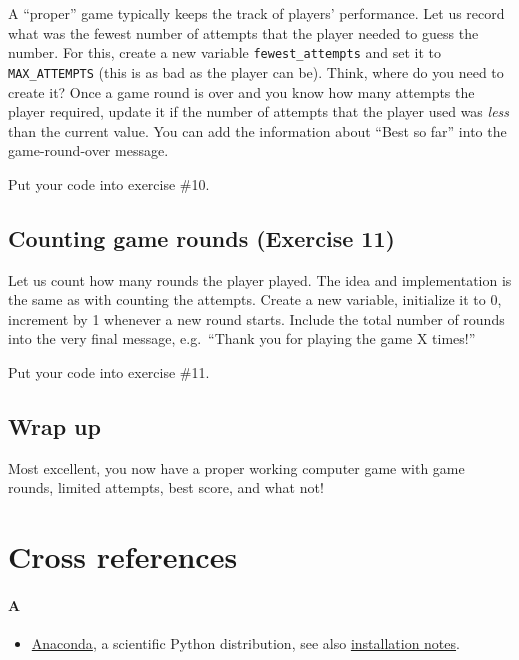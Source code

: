 \documentclass[
]{book}
\providecommand{\tightlist}{%
  \setlength{\itemsep}{0pt}\setlength{\parskip}{0pt}}
\begin{document}
A ``proper'' game typically keeps the track of players' performance. Let us record what was the fewest number of attempts that the player needed to guess the number. For this, create a new variable \texttt{fewest\_attempts} and set it to \texttt{MAX\_ATTEMPTS} (this is as bad as the player can be). Think, where do you need to create it? Once a game round is over and you know how many attempts the player required, update it if the number of attempts that the player used was \emph{less} than the current value. You can add the information about ``Best so far'' into the game-round-over message.

Put your code into exercise \#10.

\hypertarget{counting-game-rounds-exercise-11}{%
\section{Counting game rounds (Exercise 11)}\label{counting-game-rounds-exercise-11}}

Let us count how many rounds the player played. The idea and implementation is the same as with counting the attempts. Create a new variable, initialize it to 0, increment by 1 whenever a new round starts. Include the total number of rounds into the very final message, e.g.~``Thank you for playing the game X times!''

Put your code into exercise \#11.

\hypertarget{wrap-up}{%
\section{Wrap up}\label{wrap-up}}

Most excellent, you now have a proper working computer game with game rounds, limited attempts, best score, and what not!

\hypertarget{cross-references}{%
\chapter*{Cross references}\label{cross-references}}

\hypertarget{a}{%
\subsubsection*{A}\label{a}}

\begin{itemize}
\tightlist
\item
  \href{https://www.anaconda.com}{Anaconda}, a scientific Python distribution, see also \protect\hyperlink{install-anaconda}{installation notes}.
\end{itemize}
\end{document}
